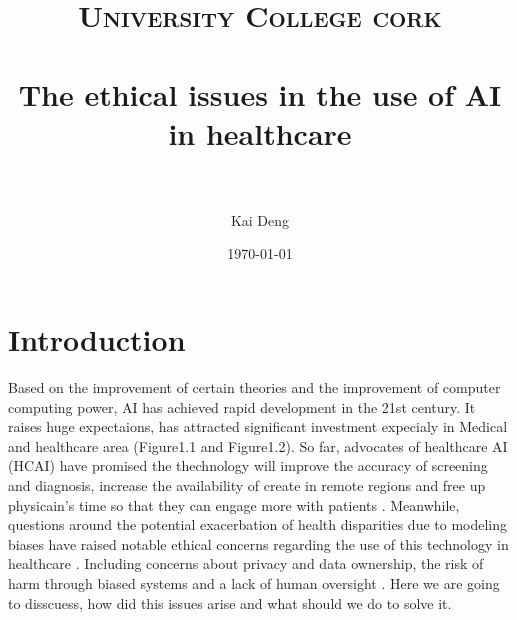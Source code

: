 \documentclass[paper=a4, fontsize=11pt]{scrartcl} %
\title{	
\normalfont \normalsize 
\textsc{University College cork} \\ [25pt] %
\horrule{0.5pt} \\[0.4cm] %
\huge The ethical issues in the use of AI in healthcare \\ %
\horrule{2pt} \\[0.5cm] %
}
\author{Kai Deng} %
\date{\normalsize\today} %
\numberwithin{equation}{section} %
\numberwithin{figure}{section} %
\numberwithin{table}{section} %
\begin{document}
\maketitle %


\section{Introduction}

Based on the improvement of certain theories and the improvement of computer computing power,
AI has achieved rapid development in the 21st century. It raises huge expectaions, has attracted 
significant investment expecialy in Medical and healthcare area (Figure1.1 and Figure1.2). So far, advocates of healthcare AI (HCAI)
have promised the thechnology will improve the accuracy of screening and diagnosis, increase the availability of create
in remote regions and free up physicain's time so that they can engage more with patients \cite{frostPublicViewsEthical2022}.
Meanwhile, questions around the potential exacerbation of health disparities due to modeling biases have raised notable ethical
concerns regarding the use of this technology in healthcare \cite{onianiAdoptingExpandingEthical2023}. Including concerns about privacy and 
data ownership, the risk of harm through biased systems and a lack of human oversight \cite{katiraiEthicsAdvancingArtificial2023}.
Here we are going to disscuess, how did this issues arise and what should we do to solve it.
\end{document}
